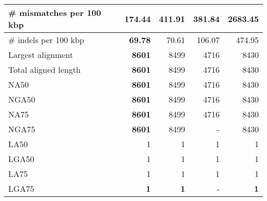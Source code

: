 \documentclass[12pt,a4paper]{article}
\begin{document}
\begin{table}[ht]
\begin{center}
\begin{tabular}{|l*{4}{|r}|}
\# mismatches per 100 kbp & {\bf 174.44} & 411.91 & 381.84 & 2683.45 \\ \hline
\# indels per 100 kbp & {\bf 69.78} & 70.61 & 106.07 & 474.95 \\ \hline
Largest alignment & {\bf 8601} & 8499 & 4716 & 8430 \\ \hline
Total aligned length & {\bf 8601} & 8499 & 4716 & 8430 \\ \hline
NA50 & {\bf 8601} & 8499 & 4716 & 8430 \\ \hline
NGA50 & {\bf 8601} & 8499 & 4716 & 8430 \\ \hline
NA75 & {\bf 8601} & 8499 & 4716 & 8430 \\ \hline
NGA75 & {\bf 8601} & 8499 & - & 8430 \\ \hline
LA50 & 1 & 1 & 1 & 1 \\ \hline
LGA50 & 1 & 1 & 1 & 1 \\ \hline
LA75 & 1 & 1 & 1 & 1 \\ \hline
LGA75 & {\bf 1} & {\bf 1} & - & {\bf 1} \\ \hline
\end{tabular}
\end{center}
\end{table}
\end{document}
